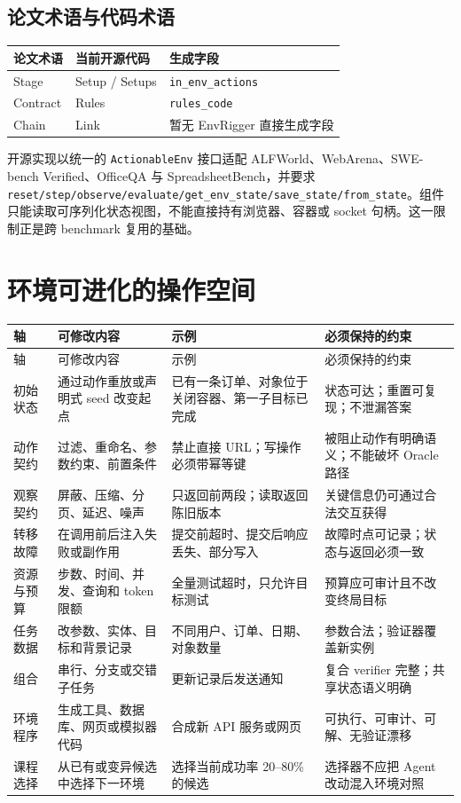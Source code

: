 \documentclass[11pt,a4paper,fontset=fandol]{ctexart}
\newcommand{\code}[1]{\texttt{#1}}
\begin{document}
\subsection{论文术语与代码术语}

\begin{center}
\begin{tabular}{lll}
\toprule
论文术语 & 当前开源代码 & 生成字段 \\
\midrule
Stage & Setup / Setups & \code{in\_env\_actions} \\
Contract & Rules & \code{rules\_code} \\
Chain & Link & 暂无 EnvRigger 直接生成字段 \\
\bottomrule
\end{tabular}
\end{center}

开源实现以统一的 \code{ActionableEnv} 接口适配 ALFWorld、WebArena、SWE-bench Verified、OfficeQA 与 SpreadsheetBench，并要求 \code{reset/step/observe/evaluate/get\_env\_state/save\_state/from\_state}\cite{envharnessrepo}。组件只能读取可序列化状态视图，不能直接持有浏览器、容器或 socket 句柄。这一限制正是跨 benchmark 复用的基础。

\section{环境可进化的操作空间}

\begin{longtable}{p{2.5cm}p{4.4cm}p{4.2cm}p{3.5cm}}
\toprule
轴 & 可修改内容 & 示例 & 必须保持的约束 \\
\midrule
\endfirsthead
\toprule
轴 & 可修改内容 & 示例 & 必须保持的约束 \\
\midrule
\endhead
初始状态 & 通过动作重放或声明式 seed 改变起点 & 已有一条订单、对象位于关闭容器、第一子目标已完成 & 状态可达；重置可复现；不泄漏答案 \\
动作契约 & 过滤、重命名、参数约束、前置条件 & 禁止直接 URL；写操作必须带幂等键 & 被阻止动作有明确语义；不能破坏 Oracle 路径 \\
观察契约 & 屏蔽、压缩、分页、延迟、噪声 & 只返回前两段；读取返回陈旧版本 & 关键信息仍可通过合法交互获得 \\
转移故障 & 在调用前后注入失败或副作用 & 提交前超时、提交后响应丢失、部分写入 & 故障时点可记录；状态与返回必须一致 \\
资源与预算 & 步数、时间、并发、查询和 token 限额 & 全量测试超时，只允许目标测试 & 预算应可审计且不改变终局目标 \\
任务数据 & 改参数、实体、目标和背景记录 & 不同用户、订单、日期、对象数量 & 参数合法；验证器覆盖新实例 \\
组合 & 串行、分支或交错子任务 & 更新记录后发送通知 & 复合 verifier 完整；共享状态语义明确 \\
环境程序 & 生成工具、数据库、网页或模拟器代码 & 合成新 API 服务或网页 & 可执行、可审计、可解、无验证漂移 \\
课程选择 & 从已有或变异候选中选择下一环境 & 选择当前成功率 20--80\% 的候选 & 选择器不应把 Agent 改动混入环境对照 \\
\bottomrule
\end{longtable}
\end{document}
